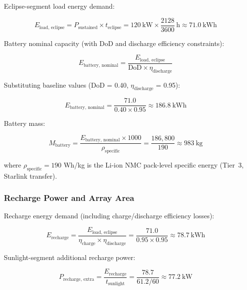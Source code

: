 Eclipse-segment load energy demand:

\begin{equation}
  E_{\text{load, eclipse}} = P_{\text{sustained}} \times t_{\text{eclipse}}
                            = 120\ \text{kW} \times \frac{2128}{3600}\ \text{h}
                            \approx 71.0\ \text{kWh}
  \label{eq:eload}
\end{equation}

Battery nominal capacity (with DoD and discharge efficiency constraints):

\begin{equation}
  E_{\text{battery, nominal}} = \frac{E_{\text{load, eclipse}}}{\text{DoD} \times \eta_{\text{discharge}}}
  \label{eq:battery-capacity}
\end{equation}

Substituting baseline values (DoD = 0.40, $\eta_{\text{discharge}}$ = 0.95):

\begin{equation}
  E_{\text{battery, nominal}} = \frac{71.0}{0.40 \times 0.95} \approx 186.8\ \text{kWh}
\end{equation}

Battery mass:

\begin{equation}
  M_{\text{battery}} = \frac{E_{\text{battery, nominal}} \times 1000}{\rho_{\text{specific}}}
                      = \frac{186,800}{190} \approx 983\ \text{kg}
  \label{eq:battery-mass}
\end{equation}

where $\rho_{\text{specific}} = 190$ Wh/kg is the Li-ion NMC pack-level specific energy (Tier~3, Starlink transfer).

\subsubsection{Recharge Power and Array Area}

Recharge energy demand (including charge/discharge efficiency losses):

\begin{equation}
  E_{\text{recharge}} = \frac{E_{\text{load, eclipse}}}{\eta_{\text{charge}} \times \eta_{\text{discharge}}}
                       = \frac{71.0}{0.95 \times 0.95} \approx 78.7\ \text{kWh}
  \label{eq:recharge-energy}
\end{equation}

Sunlight-segment additional recharge power:

\begin{equation}
  P_{\text{recharge, extra}} = \frac{E_{\text{recharge}}}{t_{\text{sunlight}}}
                               = \frac{78.7}{61.2/60} \approx 77.2\ \text{kW}
  \label{eq:recharge-power}
\end{equation}

